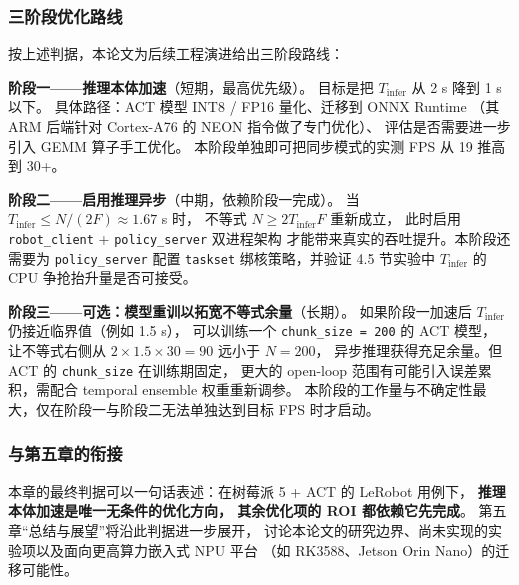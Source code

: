 \subsubsection{三阶段优化路线}\label{sec:opt-three-phases}

按上述判据，本论文为后续工程演进给出三阶段路线：

\textbf{阶段一——推理本体加速}（短期，最高优先级）。
目标是把 $T_{\text{infer}}$ 从 2 s 降到 1 s 以下。
具体路径：ACT 模型 INT8 / FP16 量化、迁移到 ONNX Runtime
（其 ARM 后端针对 Cortex-A76 的 NEON 指令做了专门优化）、
评估是否需要进一步引入 GEMM 算子手工优化。
本阶段单独即可把同步模式的实测 FPS 从 19 推高到 30+。

\textbf{阶段二——启用推理异步}（中期，依赖阶段一完成）。
当 $T_{\text{infer}} \leq N/(2F) \approx 1.67$ s 时，
不等式 $N \geq 2 T_{\text{infer}} F$ 重新成立，
此时启用 \texttt{robot\_client} + \texttt{policy\_server} 双进程架构
才能带来真实的吞吐提升。本阶段还需要为 \texttt{policy\_server}
配置 \texttt{taskset} 绑核策略，并验证 4.5 节实验中 $T_{\text{infer}}$
的 CPU 争抢抬升量是否可接受。

\textbf{阶段三——可选：模型重训以拓宽不等式余量}（长期）。
如果阶段一加速后 $T_{\text{infer}}$ 仍接近临界值（例如 1.5 s），
可以训练一个 \texttt{chunk\_size = 200} 的 ACT 模型，
让不等式右侧从 $2 \times 1.5 \times 30 = 90$ 远小于 $N = 200$，
异步推理获得充足余量。但 ACT 的 \texttt{chunk\_size} 在训练期固定，
更大的 open-loop 范围有可能引入误差累积，需配合 temporal ensemble 权重重新调参。
本阶段的工作量与不确定性最大，仅在阶段一与阶段二无法单独达到目标 FPS 时才启动。

\subsubsection{与第五章的衔接}\label{sec:opt-link-to-ch5}

本章的最终判据可以一句话表述：在树莓派 5 + ACT 的 LeRobot 用例下，
\textbf{推理本体加速是唯一无条件的优化方向，
其余优化项的 ROI 都依赖它先完成}。
第五章``总结与展望''将沿此判据进一步展开，
讨论本论文的研究边界、尚未实现的实验项以及面向更高算力嵌入式 NPU 平台
（如 RK3588、Jetson Orin Nano）的迁移可能性。
